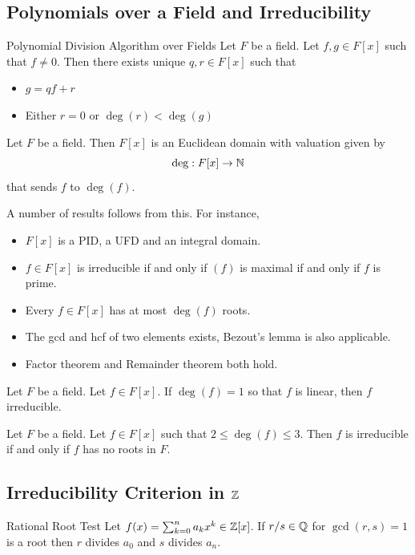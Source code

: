 \documentclass[a4paper]{article}
\begin{document}
\subsection{Polynomials over a Field and Irreducibility}
\begin{thm}{Polynomial Division Algorithm over Fields}{} Let $F$ be a field. Let $f,g\in F[x]$ such that $f\neq 0$. Then there exists unique $q,r\in F[x]$ such that 
\begin{itemize}
\item $g=qf+r$
\item Either $r=0$ or $\deg(r)<\deg(g)$
\end{itemize}
\end{thm}

\begin{lmm}{}{} Let $F$ be a field. Then $F[x]$ is an Euclidean domain with valuation given by $$\deg:F[x]\to\mathbb{N}$$ that sends $f$ to $\deg(f)$. 
\end{lmm}

A number of results follows from this. For instance, 
\begin{itemize}
\item $F[x]$ is a PID, a UFD and an integral domain. 
\item $f\in F[x]$ is irreducible if and only if $(f)$ is maximal if and only if $f$ is prime. 
\item Every $f\in F[x]$ has at most $\deg(f)$ roots. 
\item The gcd and hcf of two elements exists, Bezout's lemma is also applicable. 
\item Factor theorem and Remainder theorem both hold. 
\end{itemize}

\begin{prp}{}{} Let $F$ be a field. Let $f\in F[x]$. If $\deg(f)=1$ so that $f$ is linear, then $f$ irreducible. 
\end{prp}

\begin{prp}{}{} Let $F$ be a field. Let $f\in F[x]$ such that $2\leq\deg(f)\leq 3$. Then $f$ is irreducible if and only if $f$ has no roots in $F$. 
\end{prp}

\subsection{Irreducibility Criterion in $\mathbb{Z}$}
\begin{thm}{Rational Root Test}{} Let $f(x)=\sum_{k=0}^na_kx^k\in\mathbb{Z}[x]$. If $r/s\in\mathbb{Q}$ for $\gcd(r,s)=1$ is a root then $r$ divides $a_0$ and $s$ divides $a_n$. 
\end{thm}
\end{document}
